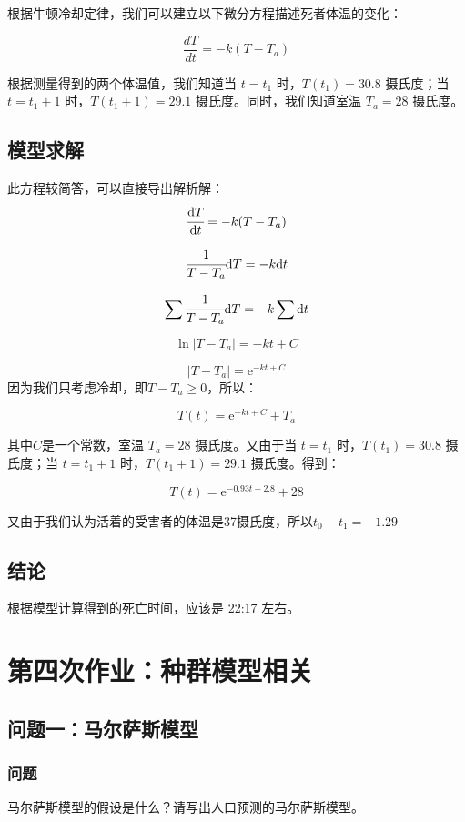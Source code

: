 \documentclass[a4,10pt,zihao=-4]{ctexart}
\begin{document}
根据牛顿冷却定律，我们可以建立以下微分方程描述死者体温的变化：

\[
\frac{dT}{dt} = -k(T - T_a)
\]

根据测量得到的两个体温值，我们知道当 \( t = t_1 \) 时，\( T(t_1) = 30.8 \) 摄氏度；当 \( t = t_1 +1\) 时，\( T(t_1 + 1) = 29.1 \) 摄氏度。同时，我们知道室温 \( T_a = 28 \) 摄氏度。

\subsection{模型求解}
此方程较简答，可以直接导出解析解：
\[
\cfrac{\text{d}T}{\text{d}t} = -k(T - T_a)
\]

\[
\cfrac{1}{T-T_a}\text{d}T = -k\text{d}t
\]

\[
\sum\cfrac{1}{T-T_a}\text{d}T = -k\sum\text{d}t
\]

\[
\ln|T-T_a| = -kt+C
\]

\[
|T-T_a|=\text{e}^{-kt+C}
\]
因为我们只考虑冷却，即$T-T_a\ge 0$，所以：

\[
T(t)=\text{e}^{-kt+C}+T_a
\]

其中$C$是一个常数，室温 \( T_a = 28 \) 摄氏度。又由于当 \( t = t_1 \) 时，\( T(t_1) = 30.8 \) 摄氏度；当 \( t = t_1 + 1\) 时，\( T(t_1 + 1) = 29.1 \) 摄氏度。得到：

\[
T(t) = \text{e}^{-0.93t+2.8} + 28
\]

又由于我们认为活着的受害者的体温是37摄氏度，所以$t_0 - t_1 =-1.29$ 

\subsection{结论}

根据模型计算得到的死亡时间，应该是 22:17 左右。


\newpage
\section{第四次作业：种群模型相关}
\subsection{问题一：马尔萨斯模型}

\subsubsection{问题}
马尔萨斯模型的假设是什么？请写出人口预测的马尔萨斯模型。
\end{document}
